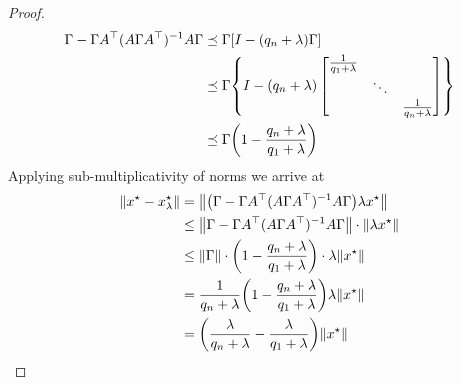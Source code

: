 \documentclass[12pt]{article}
\begin{document}
\begin{proof}
\begin{align*}
    \Gamma - \Gamma A^\top (A \Gamma A^\top)^{-1} A \Gamma
      &\preceq \Gamma {\left[I - (q_n + \lambda) \Gamma\right]} \\
      &\preceq \Gamma {\left\{I
            - (q_n + \lambda)
            \begin{bmatrix}
              \frac{1}{q_1 + \lambda} & & \\
              & \ddots & \\
              & & \frac{1}{q_n + \lambda}
            \end{bmatrix}\right\}} \\
      &\preceq \Gamma {\left(1 - \frac{q_n + \lambda}{q_1 + \lambda}\right)}
  \end{align*}
  Applying sub-multiplicativity of norms we arrive at
  \begin{align*}
    {\left\lVert x^\star - x_\lambda ^\star\right\rVert}
      &= {\left\lVert{\left(\Gamma - \Gamma A^\top (A \Gamma A^\top)^{-1} A \Gamma\right)}
      \lambda x^\star\right\rVert} \\
    &\leq
      {\left\lVert\Gamma - \Gamma A^\top (A \Gamma A^\top)^{-1} A \Gamma\right\rVert}
        \cdot {\left\lVert\lambda x^\star\right\rVert} \\
    &\leq
      {\left\lVert\Gamma\right\rVert}
        \cdot {\left(1 - \frac{q_n + \lambda}{q_1 + \lambda}\right)}
        \cdot \lambda {\left\lVert x^\star\right\rVert} \\
    &=
      \frac{1}{q_n + \lambda}
        {\left(1 - \frac{q_n + \lambda}{q_1 + \lambda}\right)}
        \lambda {\left\lVert x^\star\right\rVert} \\
    &= {\left(\frac{\lambda}{q_n + \lambda} - \frac{\lambda}{q_1 + \lambda}\right)}
        {\left\lVert x^\star\right\rVert}
  \end{align*}

\end{proof}


\printbibliography
\end{document}

